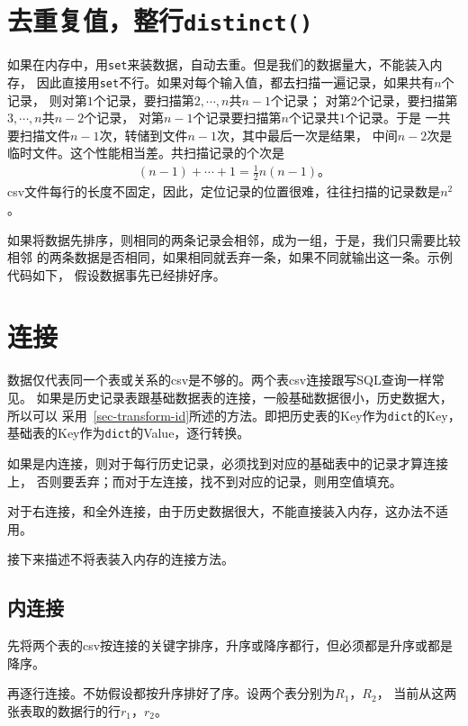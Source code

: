 \documentclass[11pt]{article}
\newcommand{\id}[1]{\texttt{#1}}
\begin{document}
\section{去重复值，整行\id{distinct()}} \label{sec-remove-duplicate}
如果在内存中，用\id{set}来装数据，自动去重。但是我们的数据量大，不能装入内存，
因此直接用\id{set}不行。如果对每个输入值，都去扫描一遍记录，如果共有$n$个记录，
则对第$1$个记录，要扫描第$2, \cdots, n$共$n-1$个记录；
对第$2$个记录，要扫描第$3, \cdots, n$共$n-2$个记录，
对第$n-1$个记录要扫描第$n$个记录共$1$个记录。于是
一共要扫描文件$n-1$次，转储到文件$n-1$次，其中最后一次是结果，
中间$n-2$次是临时文件。这个性能相当差。共扫描记录的个次是
\begin{equation} \label{scan-identical}
\begin{aligned}
(n-1) + \cdots + 1 = \frac{1}{2} n (n-1)\text{。} 
\end{aligned} 
\end{equation}
csv文件每行的长度不固定，因此，定位记录的位置很难，往往扫描的记录数是$n^2$。

如果将数据先排序，则相同的两条记录会相邻，成为一组，于是，我们只需要比较相邻
的两条数据是否相同，如果相同就丢弃一条，如果不同就输出这一条。示例代码如下，
假设数据事先已经排好序。


\section{连接}
数据仅代表同一个表或关系的csv是不够的。两个表csv连接跟写SQL查询一样常见。
如果是历史记录表跟基础数据表的连接，一般基础数据很小，历史数据大，所以可以
采用~\ref{sec-transform-id}所述的方法。即把历史表的Key作为\id{dict}的Key，
基础表的Key作为\id{dict}的Value，逐行转换。

如果是内连接，则对于每行历史记录，必须找到对应的基础表中的记录才算连接上，
否则要丢弃；而对于左连接，找不到对应的记录，则用空值填充。

对于右连接，和全外连接，由于历史数据很大，不能直接装入内存，这办法不适用。

接下来描述不将表装入内存的连接方法。

\subsection{内连接} \label{sec-inner-join}
先将两个表的csv按连接的关键字排序，升序或降序都行，但必须都是升序或都是降序。

再逐行连接。不妨假设都按升序排好了序。设两个表分别为$R_1$，$R_2$，
当前从这两张表取的数据行的行$r_1$，$r_2$。
\end{document}

